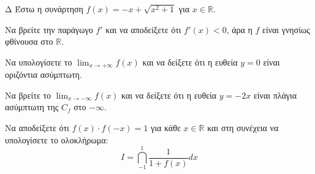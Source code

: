\begin{thema}{Δ}
Έστω η συνάρτηση $f(x) = -x + \sqrt{x^2+1}$ για $x \in \mathbb{R}$.
\begin{erwthma}
    \item Να βρείτε την παράγωγο $f'$ και να αποδείξετε ότι $f'(x) < 0$, άρα η $f$ είναι γνησίως φθίνουσα στο $\mathbb{R}$.
    \item Να υπολογίσετε το $\lim_{x\to +\infty} f(x)$ και να δείξετε ότι η ευθεία $y=0$ είναι οριζόντια ασύμπτωτη.
    \item Να βρείτε το $\lim_{x\to -\infty} f(x)$ και να δείξετε ότι η ευθεία $y = -2x$ είναι πλάγια ασύμπτωτη της $C_f$ στο $-\infty$.
    \item Να αποδείξετε ότι $f(x) \cdot f(-x) = 1$ για κάθε $x \in \mathbb{R}$ και στη συνέχεια να υπολογίσετε το ολοκλήρωμα:
    \[ I = \dint_{-1}^1 \frac{1}{1+f(x)} dx \]
\end{erwthma}
\end{thema}
